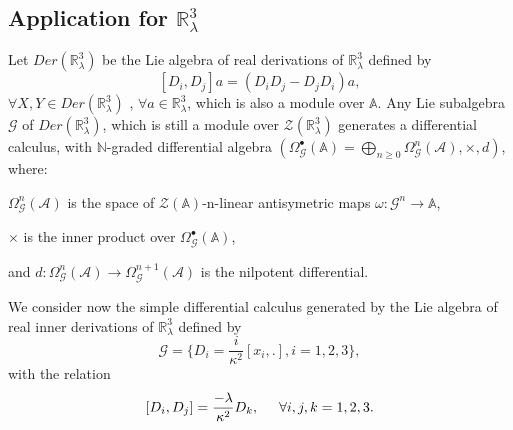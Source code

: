 \documentclass[a4paper,11pt]{article} %
\numberwithin{equation}{section} %
\numberwithin{figure}{section} %
\theoremstyle{plain} %
\theoremstyle{definition} %
\theoremstyle{remark} %
\begin{document}
\subsection*{Application for $\mathbb{R}^{3}_{\lambda}$}

\noindent
Let $Der(\mathbb{R}^{3}_{\lambda})$ be the Lie algebra of real derivations of $\mathbb{R}^{3}_{\lambda}$ defined by 
\begin{equation*}
 \left[ D_i , D_j \right]a = ( D_i D_j - D_j D_i )a, 
\end{equation*}
$\forall X, Y \in Der(\mathbb{R}^{3}_{\lambda})$ , $\forall a \in \mathbb{R}^{3}_{\lambda}$, which is also a module over $\mathcal{\mathbb{A}}$. Any Lie subalgebra $\mathcal{G}$ of $Der(\mathbb{R}^{3}_{\lambda})$, which is still a module over $\mathcal{Z}(\mathbb{R}^{3}_{\lambda})$ generates a differential calculus, with $\mathbb{N}$-graded differential algebra $\left( \Omega^{\bullet}_{\mathcal{G}}(\mathbb{A}) = \bigoplus_{n \geq 0} \Omega^{n}_{\mathcal{G}}(\mathcal{A}),\times, d \right)$, where:
\begin{description}
 \item $\Omega^{n}_{\mathcal{G}}(\mathcal{A})$ is the space of $\mathcal{Z}(\mathbb{A})$-n-linear antisymetric maps $\omega : \mathcal{G}^{n} \rightarrow \mathbb{A}$,
 \item $\times$ is the inner product over $\Omega^{\bullet}_{\mathcal{G}}(\mathbb{A})$,
 \item and $d : \Omega^{n}_{\mathcal{G}}(\mathcal{A}) \rightarrow \Omega^{n+1}_{\mathcal{G}}(\mathcal{A})$ is the nilpotent differential. 
\end{description}

\noindent
We consider now the simple differential calculus generated by the Lie algebra of real inner derivations of $\mathbb{R}^{3}_{\lambda}$ defined by
\begin{equation*}
 \mathcal{G} = \{ D_i = \frac{i}{\kappa^2} [ x_i , . ] , i=1,2,3 \},
\end{equation*}
with the relation
\begin{equation*}
 \left[ D_i , D_j \right] = \frac{-\lambda}{\kappa^2} D_k , \hspace{5mm} \forall i,j,k =1,2,3.
\end{equation*}
\end{document}

